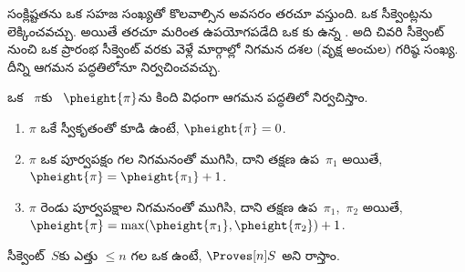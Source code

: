 \documentclass[../../../include/open-logic-section]{subfiles}
\begin{document}
 సంక్లిష్టతను ఒక సహజ సంఖ్యతో కొలవాల్సిన అవసరం తరచూ వస్తుంది. ఒక  సీక్వెంట్లను లెక్కించవచ్చు. అయితే తరచూ మరింత ఉపయోగపడేది ఒక కు ఉన్న . అది చివరి సీక్వెంట్ నుంచి ఒక ప్రారంభ సీక్వెంట్ వరకు వెళ్లే మార్గాల్లో నిగమన దశల (వృక్ష అంచుల) గరిష్ఠ సంఖ్య. దీన్ని ఆగమన పద్ధతిలోనూ నిర్వచించవచ్చు.

\begin{defn}
ఒక ~$\pi$కు \emph{}~$\pheight{\pi}$ను కింది విధంగా ఆగమన పద్ధతిలో నిర్వచిస్తాం.
\begin{enumerate}
  \item $\pi$ ఒకే స్వీకృతంతో కూడి ఉంటే, $\pheight{\pi} = 0$.
  \item $\pi$ ఒక పూర్వపక్షం గల నిగమనంతో ముగిసి, దాని తక్షణ ఉప~$\pi_1$ అయితే, $\pheight{\pi} = \pheight{\pi_1} + 1$.
  \item $\pi$ రెండు పూర్వపక్షాల నిగమనంతో ముగిసి, దాని తక్షణ ఉప~$\pi_1$,~$\pi_2$ అయితే, $\pheight{\pi} = \max(\pheight{\pi_1}, \pheight{\pi_2}) + 1$.
\end{enumerate}
సీక్వెంట్~$S$కు ఎత్తు $\le n$ గల ఒక  ఉంటే, $\Proves[n] S$ అని రాస్తాం.
\end{defn}
\end{document}
